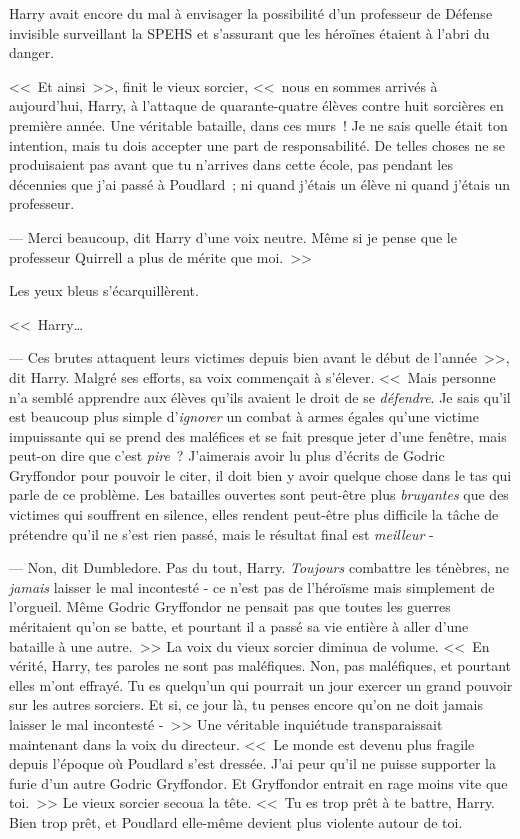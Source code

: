 Harry avait encore du mal à envisager la possibilité d'un professeur de Défense invisible surveillant la SPEHS et s'assurant que les héroïnes étaient à l'abri du danger.

<<~Et ainsi~>>, finit le vieux sorcier, <<~nous en sommes arrivés à aujourd'hui, Harry, à l'attaque de quarante-quatre élèves contre huit sorcières en première année. Une véritable bataille, dans ces murs~! Je ne sais quelle était ton intention, mais tu dois accepter une part de responsabilité. De telles choses ne se produisaient pas avant que tu n'arrives dans cette école, pas pendant les décennies que j'ai passé à Poudlard~; ni quand j'étais un élève ni quand j'étais un professeur.

--- Merci beaucoup, dit Harry d'une voix neutre. Même si je pense que le professeur Quirrell a plus de mérite que moi.~>>

Les yeux bleus s'écarquillèrent.

<<~Harry…

--- Ces brutes attaquent leurs victimes depuis bien avant le début de l'année~>>, dit Harry. Malgré ses efforts, sa voix commençait à s'élever. <<~Mais personne n'a semblé apprendre aux élèves qu'ils avaient le droit de se \emph{défendre}. Je sais qu'il est beaucoup plus simple d'\emph{ignorer} un combat à armes égales qu'une victime impuissante qui se prend des maléfices et se fait presque jeter d'une fenêtre, mais peut-on dire que c'est \emph{pire}~? J'aimerais avoir lu plus d'écrits de Godric Gryffondor pour pouvoir le citer, il doit bien y avoir quelque chose dans le tas qui parle de ce problème. Les batailles ouvertes sont peut-être plus \emph{bruyantes} que des victimes qui souffrent en silence, elles rendent peut-être plus difficile la tâche de prétendre qu'il ne s'est rien passé, mais le résultat final est \emph{meilleur} -

--- Non, dit Dumbledore. Pas du tout, Harry. \emph{Toujours} combattre les ténèbres, ne \emph{jamais} laisser le mal incontesté - ce n'est pas de l'héroïsme mais simplement de l'orgueil. Même Godric Gryffondor ne pensait pas que toutes les guerres méritaient qu'on se batte, et pourtant il a passé sa vie entière à aller d'une bataille à une autre.~>> La voix du vieux sorcier diminua de volume. <<~En vérité, Harry, tes paroles ne sont pas maléfiques. Non, pas maléfiques, et pourtant elles m'ont effrayé. Tu es quelqu'un qui pourrait un jour exercer un grand pouvoir sur les autres sorciers. Et si, ce jour là, tu penses encore qu'on ne doit jamais laisser le mal incontesté -~>> Une véritable inquiétude transparaissait maintenant dans la voix du directeur. <<~Le monde est devenu plus fragile depuis l'époque où Poudlard s'est dressée. J'ai peur qu'il ne puisse supporter la furie d'un autre Godric Gryffondor. Et Gryffondor entrait en rage moins vite que toi.~>> Le vieux sorcier secoua la tête. <<~Tu es trop prêt à te battre, Harry. Bien trop prêt, et Poudlard elle-même devient plus violente autour de toi.

